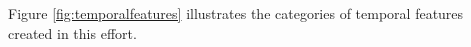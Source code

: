 Figure \ref{fig:temporalfeatures} illustrates the categories of temporal features created in this effort.